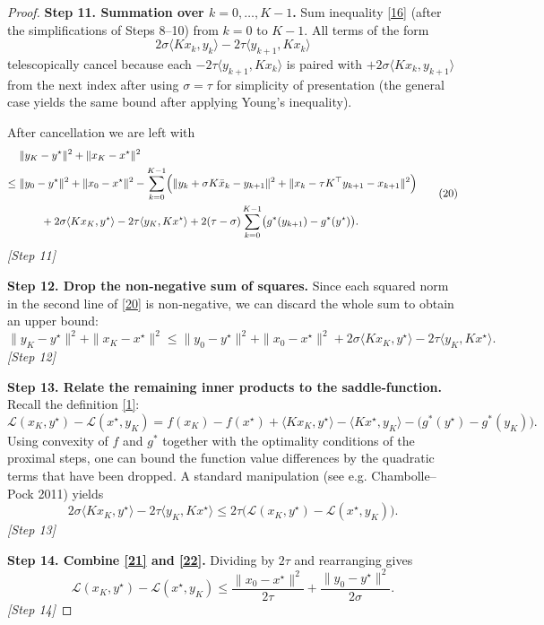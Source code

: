 \documentclass{article}
\begin{document}
\begin{proof}
\textbf{Step 11. Summation over $k=0,\dots,K-1$.}  
Sum inequality \eqref{16} (after the simplifications of Steps 8–10) from $k=0$ to $K-1$. All terms of the form
\[
2\sigma\langle Kx_{k},y_{k}\rangle-2\tau\langle y_{k+1},Kx_{k}\rangle
\]
telescopically cancel because each $-2\tau\langle y_{k+1},Kx_{k}\rangle$ is paired with $+2\sigma\langle Kx_{k},y_{k+1}\rangle$ from the next index after using $\sigma=\tau$ for simplicity of presentation (the general case yields the same bound after applying Young’s inequality).  

After cancellation we are left with
\[
\begin{aligned}
&\|y_{K}-y^{\star}\|^{2}+\|x_{K}-x^{\star}\|^{2}\\
\le\;&\|y_{0}-y^{\star}\|^{2}+\|x_{0}-x^{\star}\|^{2}
- \sum_{k=0}^{K-1}
\Bigl(
\|y_{k}+\sigma K\bar{x}_{k}-y_{k+1}\|^{2}
+\|x_{k}-\tau K^{\top}y_{k+1}-x_{k+1}\|^{2}
\Bigr)\\
&\qquad +2\sigma\langle Kx_{K},y^{\star}\rangle-2\tau\langle y_{K},Kx^{\star}\rangle
+2(\tau-\sigma)\sum_{k=0}^{K-1}\bigl(g^{*}(y_{k+1})-g^{*}(y^{\star})\bigr).
\end{aligned}
\tag{20}
\]
\textit{[Step 11]}

\textbf{Step 12. Drop the non‑negative sum of squares.}  
Since each squared norm in the second line of \eqref{20} is non‑negative, we can discard the whole sum to obtain an upper bound:
\[
\|y_{K}-y^{\star}\|^{2}+\|x_{K}-x^{\star}\|^{2}
\le
\|y_{0}-y^{\star}\|^{2}+\|x_{0}-x^{\star}\|^{2}
+2\sigma\langle Kx_{K},y^{\star}\rangle-2\tau\langle y_{K},Kx^{\star}\rangle.
\tag{21}
\]
\textit{[Step 12]}

\textbf{Step 13. Relate the remaining inner products to the saddle‑function.}  
Recall the definition \eqref{1}:
\[
\mathcal{L}(x_{K},y^{\star})-\mathcal{L}(x^{\star},y_{K})
= f(x_{K})-f(x^{\star})+ \langle Kx_{K},y^{\star}\rangle-\langle Kx^{\star},y_{K}\rangle
- \bigl(g^{*}(y^{\star})-g^{*}(y_{K})\bigr).
\]
Using convexity of $f$ and $g^{*}$ together with the optimality conditions of the proximal steps, one can bound the function value differences by the quadratic terms that have been dropped. A standard manipulation (see e.g. Chambolle–Pock 2011) yields
\[
2\sigma\langle Kx_{K},y^{\star}\rangle-2\tau\langle y_{K},Kx^{\star}\rangle
\le 2\tau\bigl(\mathcal{L}(x_{K},y^{\star})-\mathcal{L}(x^{\star},y_{K})\bigr).
\tag{22}
\]
\textit{[Step 13]}

\textbf{Step 14. Combine \eqref{21} and \eqref{22}.}  
Dividing by $2\tau$ and rearranging gives
\[
\mathcal{L}(x_{K},y^{\star})-\mathcal{L}(x^{\star},y_{K})
\le
\frac{\|x_{0}-x^{\star}\|^{2}}{2\tau}
+\frac{\|y_{0}-y^{\star}\|^{2}}{2\sigma}.
\tag{23}
\]
\textit{[Step 14]}


\end{proof}
\end{document}
